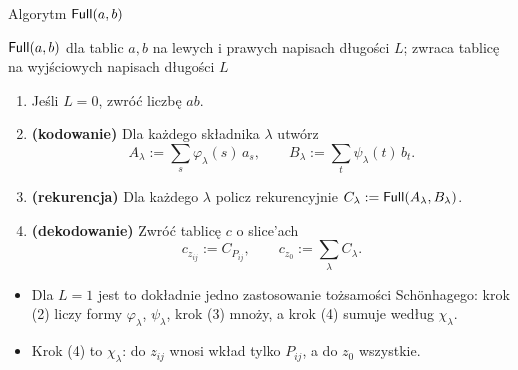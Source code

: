 \begin{frame}{Algorytm $\mathsf{Full}(a,b)$}
  \begin{block}{$\mathsf{Full}(a,b)$ dla tablic $a,b$ na lewych i prawych napisach długości $L$; zwraca tablicę na wyjściowych napisach długości $L$}\small
    \begin{enumerate}
      \item Jeśli $L=0$, zwróć liczbę $ab$.
      \item \textbf{(kodowanie)} Dla każdego składnika $\lambda$ utwórz
        \[A_\lambda:=\sum_s\varphi_\lambda(s)\,a_s,\qquad B_\lambda:=\sum_t\psi_\lambda(t)\,b_t.\]
      \item \textbf{(rekurencja)} Dla każdego $\lambda$ policz rekurencyjnie $C_\lambda:=\mathsf{Full}(A_\lambda,B_\lambda)$.
      \item \textbf{(dekodowanie)} Zwróć tablicę $c$ o slice'ach
        \[c_{z_{ij}}:=C_{P_{ij}},\qquad c_{z_0}:=\sum_\lambda C_\lambda.\]
    \end{enumerate}
  \end{block}
  \pause
  \begin{itemize}\small
    \item Dla $L=1$ jest to dokładnie jedno zastosowanie tożsamości Schönhagego: krok (2) liczy formy
      $\varphi_\lambda$, $\psi_\lambda$, krok (3) mnoży, a krok (4) sumuje według $\chi_\lambda$.
    \item Krok (4) to $\chi_\lambda$: do $z_{ij}$ wnosi wkład tylko $P_{ij}$, a do $z_0$ wszystkie.
  \end{itemize}
\end{frame}

